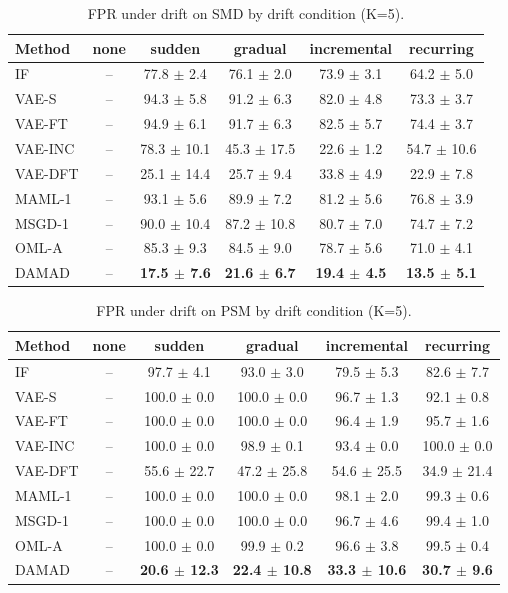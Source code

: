 \begin{table}[t]
\centering
\small
\caption{FPR under drift on SMD by drift condition (K=5).}
\label{tab:drift_fpr_drift_smd}
\begin{tabular}{lccccc}
\toprule
Method & none & sudden & gradual & incremental & recurring \\
\midrule
IF & – & 77.8 $\pm$ 2.4 & 76.1 $\pm$ 2.0 & 73.9 $\pm$ 3.1 & 64.2 $\pm$ 5.0 \\
VAE-S & – & 94.3 $\pm$ 5.8 & 91.2 $\pm$ 6.3 & 82.0 $\pm$ 4.8 & 73.3 $\pm$ 3.7 \\
VAE-FT & – & 94.9 $\pm$ 6.1 & 91.7 $\pm$ 6.3 & 82.5 $\pm$ 5.7 & 74.4 $\pm$ 3.7 \\
VAE-INC & – & 78.3 $\pm$ 10.1 & 45.3 $\pm$ 17.5 & 22.6 $\pm$ 1.2 & 54.7 $\pm$ 10.6 \\
VAE-DFT & – & 25.1 $\pm$ 14.4 & 25.7 $\pm$ 9.4 & 33.8 $\pm$ 4.9 & 22.9 $\pm$ 7.8 \\
MAML-1 & – & 93.1 $\pm$ 5.6 & 89.9 $\pm$ 7.2 & 81.2 $\pm$ 5.6 & 76.8 $\pm$ 3.9 \\
MSGD-1 & – & 90.0 $\pm$ 10.4 & 87.2 $\pm$ 10.8 & 80.7 $\pm$ 7.0 & 74.7 $\pm$ 7.2 \\
OML-A & – & 85.3 $\pm$ 9.3 & 84.5 $\pm$ 9.0 & 78.7 $\pm$ 5.6 & 71.0 $\pm$ 4.1 \\
DAMAD & – & \textbf{17.5 $\pm$ 7.6} & \textbf{21.6 $\pm$ 6.7} & \textbf{19.4 $\pm$ 4.5} & \textbf{13.5 $\pm$ 5.1} \\
\bottomrule
\end{tabular}
\end{table}

\begin{table}[t]
\centering
\small
\caption{FPR under drift on PSM by drift condition (K=5).}
\label{tab:drift_fpr_drift_psm}
\begin{tabular}{lccccc}
\toprule
Method & none & sudden & gradual & incremental & recurring \\
\midrule
IF & – & 97.7 $\pm$ 4.1 & 93.0 $\pm$ 3.0 & 79.5 $\pm$ 5.3 & 82.6 $\pm$ 7.7 \\
VAE-S & – & 100.0 $\pm$ 0.0 & 100.0 $\pm$ 0.0 & 96.7 $\pm$ 1.3 & 92.1 $\pm$ 0.8 \\
VAE-FT & – & 100.0 $\pm$ 0.0 & 100.0 $\pm$ 0.0 & 96.4 $\pm$ 1.9 & 95.7 $\pm$ 1.6 \\
VAE-INC & – & 100.0 $\pm$ 0.0 & 98.9 $\pm$ 0.1 & 93.4 $\pm$ 0.0 & 100.0 $\pm$ 0.0 \\
VAE-DFT & – & 55.6 $\pm$ 22.7 & 47.2 $\pm$ 25.8 & 54.6 $\pm$ 25.5 & 34.9 $\pm$ 21.4 \\
MAML-1 & – & 100.0 $\pm$ 0.0 & 100.0 $\pm$ 0.0 & 98.1 $\pm$ 2.0 & 99.3 $\pm$ 0.6 \\
MSGD-1 & – & 100.0 $\pm$ 0.0 & 100.0 $\pm$ 0.0 & 96.7 $\pm$ 4.6 & 99.4 $\pm$ 1.0 \\
OML-A & – & 100.0 $\pm$ 0.0 & 99.9 $\pm$ 0.2 & 96.6 $\pm$ 3.8 & 99.5 $\pm$ 0.4 \\
DAMAD & – & \textbf{20.6 $\pm$ 12.3} & \textbf{22.4 $\pm$ 10.8} & \textbf{33.3 $\pm$ 10.6} & \textbf{30.7 $\pm$ 9.6} \\
\bottomrule
\end{tabular}
\end{table}

